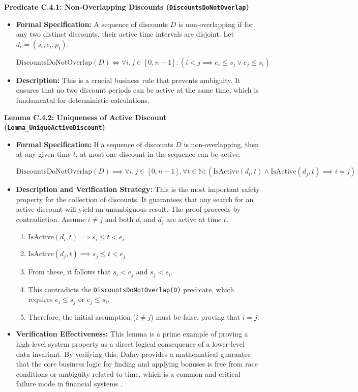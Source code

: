 \documentclass[
  english,
  onecolumn]{article}
\providecommand{\tightlist}{%
  \setlength{\itemsep}{0pt}\setlength{\parskip}{0pt}}
\begin{document}
\textbf{Predicate C.4.1: Non-Overlapping Discounts
(\texttt{DiscountsDoNotOverlap})}

\begin{itemize}
\item
  \textbf{Formal Specification:} A sequence of discounts \(D\) is
  non-overlapping if for any two distinct discounts, their active time
  intervals are disjoint. Let \(d_i = (s_i, e_i, p_i)\).

  \(\text{DiscountsDoNotOverlap}(D) \iff \forall i, j \in [0, n-1] : (i < j \implies e_i \le s_j \lor e_j \le s_i)\)
\item
  \textbf{Description:} This is a crucial business rule that prevents
  ambiguity. It ensures that no two discount periods can be active at
  the same time, which is fundamental for deterministic calculations.
\end{itemize}

\textbf{Lemma C.4.2: Uniqueness of Active Discount
(\texttt{Lemma\_UniqueActiveDiscount})}

\begin{itemize}
\item
  \textbf{Formal Specification:} If a sequence of discounts \(D\) is
  non-overlapping, then at any given time \(t\), at most one discount in
  the sequence can be active.

  \(\text{DiscountsDoNotOverlap}(D) \implies \forall i, j \in [0, n-1], \forall t \in \mathbb{N} : (\text{IsActive}(d_i, t) \land \text{IsActive}(d_j, t) \implies i = j)\)
\item
  \textbf{Description and Verification Strategy:} This is the most
  important safety property for the collection of discounts. It
  guarantees that any search for an active discount will yield an
  unambiguous result. The proof proceeds by contradiction. Assume
  \(i \ne j\) and both \(d_i\) and \(d_j\) are active at time \(t\).

  \begin{enumerate}
  \def\labelenumi{\arabic{enumi}.}
  \tightlist
  \item
    \(\text{IsActive}(d_i, t) \implies s_i \le t < e_i\)
  \item
    \(\text{IsActive}(d_j, t) \implies s_j \le t < e_j\)
  \item
    From these, it follows that \(s_i < e_j\) and \(s_j < e_i\).
  \item
    This contradicts the \texttt{DiscountsDoNotOverlap(D)} predicate,
    which requires \(e_i \le s_j\) or \(e_j \le s_i\).
  \item
    Therefore, the initial assumption (\(i \ne j\)) must be false,
    proving that \(i = j\).
  \end{enumerate}
\item
  \textbf{Verification Effectiveness:} This lemma is a prime example of
  proving a high-level system property as a direct logical consequence
  of a lower-level data invariant. By verifying this, Dafny provides a
  mathematical guarantee that the core business logic for finding and
  applying bonuses is free from race conditions or ambiguity related to
  time, which is a common and critical failure mode in financial systems
  .
\end{itemize}
\end{document}
